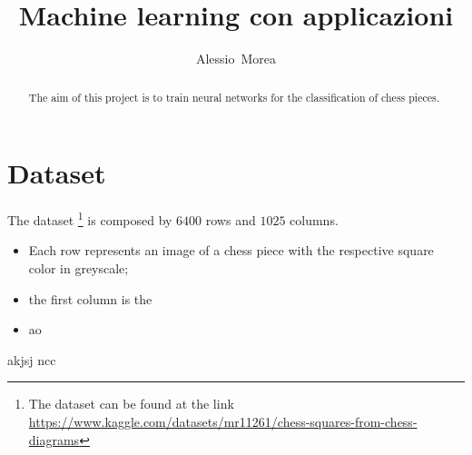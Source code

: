 \documentclass[12pt,english, openany]{article}		%
\begin{document}
\title{Machine learning con applicazioni}
\author{Alessio~Morea}

\maketitle



\begin{abstract}
The aim of this project is to train neural networks for the classification of chess pieces.
\end{abstract}
\section{Dataset}
The dataset \footnote{The dataset can be found at the link \href{https://www.kaggle.com/datasets/mr11261/chess-squares-from-chess-diagrams}{https://www.kaggle.com/datasets/mr11261/chess-squares-from-chess-diagrams}}
 is composed by $6400$ rows and $1025$ columns.
\begin{itemize}
\item Each row represents an image of a chess piece with the respective square color in greyscale;
\item the first column is the 
\item ao
\end{itemize}

\cite{10.5555/2188385.2188395}

akjsj
\cite{geron2017hands-on}
ncc
\cite{https://doi.org/10.48550/arxiv.1412.6980}



\end{document}
